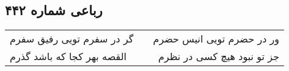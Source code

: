 \begin{center}
\section*{رباعی شماره ۴۴۲}
\label{sec:sh442}
\begin{longtable}{l p{0.5cm} r}
گر در سفرم تویی رفیق سفرم
&&
ور در حضرم تویی انیس حضرم
\\
القصه بهر کجا که باشد گذرم
&&
جز تو نبود هیچ کسی در نظرم
\\
\end{longtable}
\end{center}
